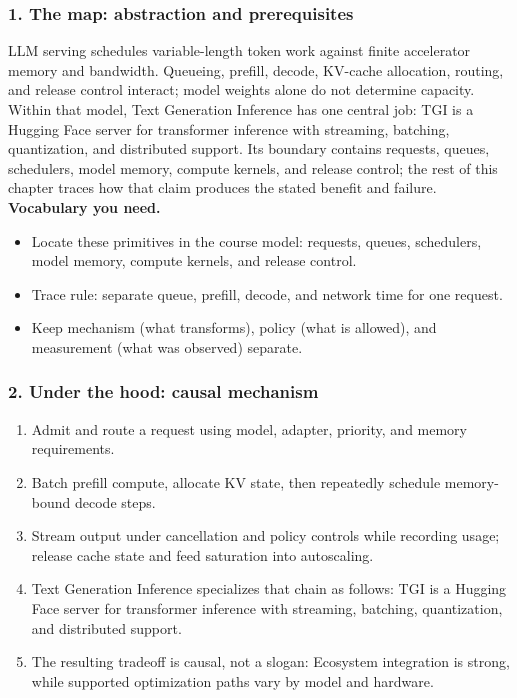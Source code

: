 \subsubsection*{1. The map: abstraction and prerequisites}
LLM serving schedules variable-length token work against finite accelerator memory and bandwidth. Queueing, prefill, decode, KV-cache allocation, routing, and release control interact; model weights alone do not determine capacity.
Within that model, Text Generation Inference has one central job: TGI is a Hugging Face server for transformer inference with streaming, batching, quantization, and distributed support. Its boundary contains requests, queues, schedulers, model memory, compute kernels, and release control; the rest of this chapter traces how that claim produces the stated benefit and failure.
\textbf{Vocabulary you need.}\begin{itemize}
\item Locate these primitives in the course model: requests, queues, schedulers, model memory, compute kernels, and release control.
\item Trace rule: separate queue, prefill, decode, and network time for one request.
\item Keep mechanism (what transforms), policy (what is allowed), and measurement (what was observed) separate.
\end{itemize}
\subsubsection*{2. Under the hood: causal mechanism}\begin{enumerate}
\item Admit and route a request using model, adapter, priority, and memory requirements.
\item Batch prefill compute, allocate KV state, then repeatedly schedule memory-bound decode steps.
\item Stream output under cancellation and policy controls while recording usage; release cache state and feed saturation into autoscaling.
\item Text Generation Inference specializes that chain as follows: TGI is a Hugging Face server for transformer inference with streaming, batching, quantization, and distributed support.
\item The resulting tradeoff is causal, not a slogan: Ecosystem integration is strong, while supported optimization paths vary by model and hardware.
\end{enumerate}
